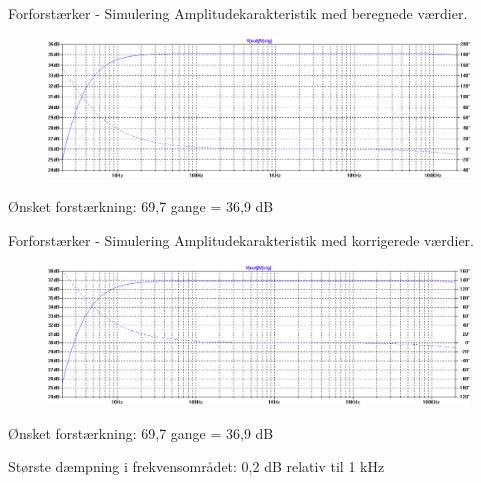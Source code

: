 \begin{frame}{Forforstærker - Simulering}
Amplitudekarakteristik med beregnede værdier.
\begin{figure}[h]
\centering
\includegraphics[scale=.23]{images/amplitudeforforstaerkerberegnet.png}
\end{figure}

Ønsket forstærkning: 69,7 gange = 36,9 dB
\end{frame}

\begin{frame}{Forforstærker - Simulering}
Amplitudekarakteristik med korrigerede værdier.
\begin{figure}[h]
\centering
\includegraphics[scale=.23]{images/amplitudeforforstaerkerkorrigeret.png}
\end{figure}
Ønsket forstærkning: 69,7 gange = 36,9 dB

Største dæmpning i frekvensområdet: 0,2 dB relativ til 1 kHz

\end{frame}


